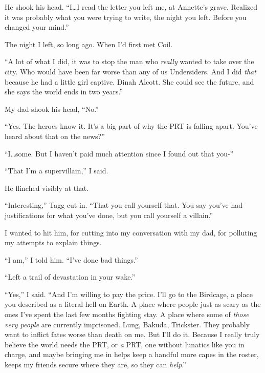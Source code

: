 He shook his head.  ``I\ldots I read the letter you left me, at Annette's grave.  Realized it was probably what you were trying to write, the night you left.  Before you changed your mind.''



The night I left, so long ago.  When I'd first met Coil.



``A lot of what I did, it was to stop the man who \emph{really} wanted to take over the city.  Who would have been far worse than any of us Undersiders.  And I did \emph{that} because he had a little girl captive.  Dinah Alcott.  She could see the future, and she says the world ends in two years.''



My dad shook his head, ``No.''



``Yes.  The heroes know it.  It's a big part of why the PRT is falling apart.  You've heard about that on the news?''



``I\ldots some.  But I haven't paid much attention since I found out that you-''



``That I'm a supervillain,'' I said.



He flinched visibly at that.



``Interesting,'' Tagg cut in.  ``That you call yourself that.  You say you've had justifications for what you've done, but you call yourself a villain.''



I wanted to hit him, for cutting into my conversation with my dad, for polluting my attempts to explain things.



``I am,'' I told him.  ``I've done bad things.''



``Left a trail of devastation in your wake.''



``Yes,'' I said.  ``And I'm willing to pay the price.  I'll go to the Birdcage, a place you described as a literal hell on Earth.  A place where people just as scary as the ones I've spent the last few months fighting stay.  A place where some of \emph{those very people} are currently imprisoned.  Lung, Bakuda, Trickster.  They probably want to inflict fates worse than death on me.  But I'll do it.  Because I really truly believe the world needs the PRT, or \emph{a} PRT, one without lunatics like you in charge, and maybe bringing me in helps keep a handful more capes in the roster, keeps my friends secure where they are, so they can \emph{help}.''



